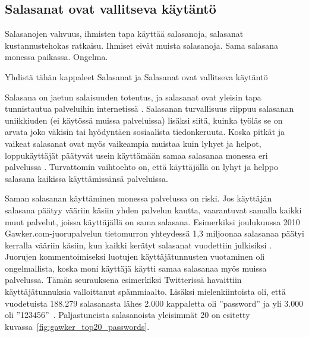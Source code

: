 \documentclass[finnish,gradu]{tktltiki}
\begin{document}


  \subsection{Salasanat ovat vallitseva käytäntö} %
  \label{sub:salasanat}
  Salasanojen vahvuus, ihmisten tapa käyttää salasanoja, salasanat kustannustehokas ratkaisu.
  Ihmiset eivät muista salasanoja. Sama salasana monessa paikassa. Ongelma.

  Yhdistä tähän kappaleet Salasanat ja Salasanat ovat vallitseva käytäntö

  Salasana on jaetun salaisuuden toteutus, ja salasanat ovat yleisin tapa tunnistautua palveluihin internetissä \cite{study_of_passwords_07, passpet_06, password_management_strategies_06, pwdhash_extension_05}.
  Salasanan turvallisuus riippuu salasanan uniikkiuden (ei käytössä muissa palveluissa) lisäksi siitä, kuinka työläs se on arvata joko väkisin tai hyödyntäen sosiaalista tiedonkeruuta. Koska pitkät ja vaikeat salasanat ovat myös vaikeampia muistaa kuin lyhyet ja helpot, loppukäyttäjät päätyvät usein käyttämään samaa salasanaa monessa eri palvelussa \cite{study_of_passwords_07}. Turvattomin vaihtoehto on, että käyttäjällä on lyhyt ja helppo salasana kaikissa käyttämissänsä palveluissa.

  Saman salasanan käyttäminen monessa palvelussa on riski. Jos käyttäjän salasana päätyy vääriin käsiin yhden palvelun kautta, vaarantuvat samalla kaikki muut palvelut, joissa käyttäjällä on sama salasana. Esimerkiksi joulukuussa 2010 Gawker.com-juorupalvelun tietomurron yhteydessä 1,3 miljoonaa salasanaa päätyi kerralla vääriin käsiin, kun kaikki kerätyt salasanat vuodettiin julkisiksi \cite{bbc_gawker_12_2010, forbes_gawker_12_2010}. Juorujen kommentoimiseksi luotujen käyttäjätunnusten vuotaminen oli ongelmallista, koska moni käyttäjä käytti samaa salasanaa myös muissa palvelussa. Tämän seurauksena esimerkiksi Twitterissä havaittiin käyttäjätunnuksia valloittanut spämmiaalto. Lisäksi mielenkiintoista oli, että vuodetuista 188.279 salasanasta lähes 2.000 kappaletta oli ''password'' ja yli 3.000 oli  ''123456''~\cite{forbes_gawker_12_2010}. Paljastuneista salasanoista yleisimmät 20 on esitetty kuvassa~\ref{fig:gawker_top20_passwords}.

\end{document}
